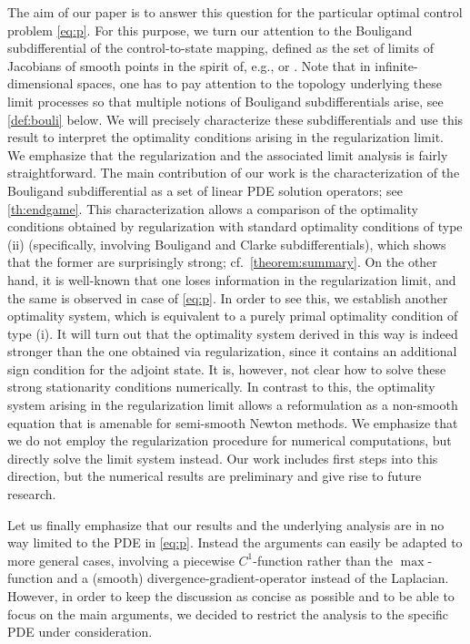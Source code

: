 \documentclass[reqno]{shinyart}
\begin{document}
The aim of our paper is to answer this question for the particular optimal control problem \eqref{eq:p}.
For this purpose, we turn our attention to the Bouligand subdifferential of the control-to-state mapping, 
defined as the set of limits of Jacobians of smooth points in the spirit of, 
e.g., \cite[Def.~2.12]{okz98} or \cite[Sec.~1.3]{kk02}. Note that
in infinite-dimensional spaces, one has to pay attention to the topology underlying these limit processes 
so that multiple notions of Bouligand subdifferentials arise, see \cref{def:bouli} below.
We will precisely characterize these subdifferentials and use this result to interpret the 
optimality conditions arising in the regularization limit. 
We emphasize that the regularization and the associated limit analysis is fairly straightforward. 
The main contribution of our work is the characterization of the Bouligand subdifferential as a 
set of linear PDE solution operators; see \cref{th:endgame}.  
This characterization allows a comparison of the optimality conditions obtained by regularization with standard optimality conditions of type (ii) (specifically, involving Bouligand and Clarke subdifferentials), 
which shows that the former are surprisingly strong; cf.~\cref{theorem:summary}. 
On the other hand, it is well-known that one loses information in the regularization limit, 
and the same is observed in case of \eqref{eq:p}. In order to see this, 
we establish another optimality system, which is equivalent to a purely primal optimality condition of type (i). It will turn out that the optimality system derived in this way 
is indeed stronger than the one obtained via regularization, since it contains an additional sign condition 
for the adjoint state. It is, however, not clear how to solve these strong stationarity conditions numerically. 
In contrast to this, the optimality system arising in the regularization limit allows a reformulation 
as a non-smooth equation that is amenable for semi-smooth Newton methods. We emphasize that we do not employ the regularization procedure for numerical computations, but 
directly solve the limit system instead. 
Our work includes first steps into this direction, but the numerical results are preliminary 
and give rise to future research.

Let us finally emphasize that our results and the underlying analysis are in no way limited to the 
PDE in \eqref{eq:p}. Instead the arguments can easily be adapted to more general cases, involving 
a piecewise $C^1$-function rather than the $\max$-function and a (smooth) divergence-gradient-operator 
instead of the Laplacian. However, in order to keep the discussion as concise as possible and to be able to 
focus on the main arguments, we decided to restrict the analysis to the specific PDE under consideration.
\end{document}
